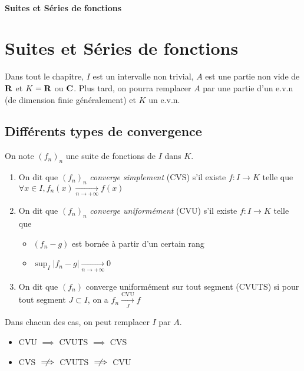 \ifsolo
    ~

    \vspace{1cm}

    \begin{center}
        \textbf{\LARGE Suites et Séries de fonctions} \\[1em]
    \end{center}
    \tableofcontents
\else
    \chapter{Suites et Séries de fonctions}

    \minitoc
\fi
\thispagestyle{empty}

Dans tout le chapitre, $I$ est un intervalle non trivial, $A$ est une partie non vide de $\mathbf R$ et $K=\mathbf R$ ou $\mathbf C$. Plus tard, on pourra remplacer $A$ par une partie d'un e.v.n (de dimension finie généralement) et $K$ un e.v.n.

\section{Différents types de convergence}

\begin{dfn}
    On note $(f_n)_n$ une suite de fonctions de $I$ dans $K$. \begin{enumerate}
        \item On dit que $(f_n)_n$ \emph{converge simplement} (CVS) s'il existe $f:I\to K$ telle que $\forall x\in I, f_n(x)\xrightarrow[n\to+\infty]{} f(x)$
        \item On dit que $(f_n)_n$ \emph{converge uniformément} (CVU) s'il existe $f:I\to K$ telle que \begin{itemize}
            \item $(f_n-g)$ est bornée à partir d'un certain rang
            \item $\sup_I|f_n-g|\xrightarrow[n\to+\infty]{}0$
        \end{itemize}
    \item On dit que $(f_n)$ converge uniformément sur tout segment (CVUTS) si pour tout segment $J\subset I$, on a $f_n\xrightarrow[J]{\mathrm{CVU}}f$
    \end{enumerate}
    Dans chacun des cas, on peut remplacer $I$ par $A$.
\end{dfn}

\begin{rem}
    \begin{itemize}
        \item CVU $\implies$ CVUTS $\implies$ CVS
        \item CVS $\centernot\implies$ CVUTS $\centernot \implies$ CVU
    \end{itemize}
\end{rem}

